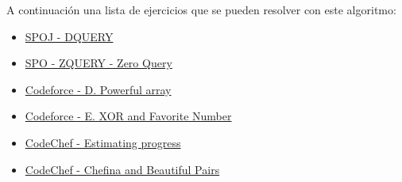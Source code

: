 A continuación una lista de ejercicios que se pueden resolver con este algoritmo:

\begin{itemize}
	\item \href{https://www.spoj.com/problems/DQUERY}{SPOJ - DQUERY}
	\item \href{https://www.spoj.com/problems/ZQUERY/}{SPO - ZQUERY - Zero Query}
	\item \href{https://codeforces.com/contest/86/problem/D}{Codeforce - D. Powerful array}
	\item \href{https://codeforces.com/contest/617/problem/E}{Codeforce - E. XOR and Favorite Number}
	\item \href{https://www.codechef.com/problems/STDPRGS}{CodeChef - Estimating progress}
	\item \href{https://www.codechef.com/problems/DECOPAIR} {CodeChef - Chefina and Beautiful Pairs}
\end{itemize} 